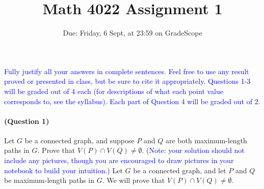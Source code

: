 \documentclass[12 pt]{article}
\title{Math 4022 Assignment 1}
\date{Due: Friday, 6 Sept, at 23:59 on GradeScope}
\begin{document}
\maketitle

\textcolor{blue}{Fully justify all your answers in complete sentences. Feel free to use any result proved or presented in class, but be sure to cite it appropriately. Questions 1-3 will be graded out of 4 each (for descriptions of what each point value corresponds to, see the syllabus). Each part of Question 4 will be graded out of 2.}

\vskip 4mm

\paragraph{(Question 1)} Let $G$ be a connected graph, and suppose $P$ and $Q$ are both maximum-length paths in $G$. Prove that $V(P) \cap V(Q) \neq \emptyset$. \textcolor{blue}{(Note: your solution should not include any pictures, though you are encouraged to draw pictures in your notebook to build your intuition.)}
Let $G$ be a connected graph, and let $P$ and $Q$ be maximum-length paths in $G$. We will prove that $V(P) \cap V(Q) \neq \emptyset$.
\end{document}
